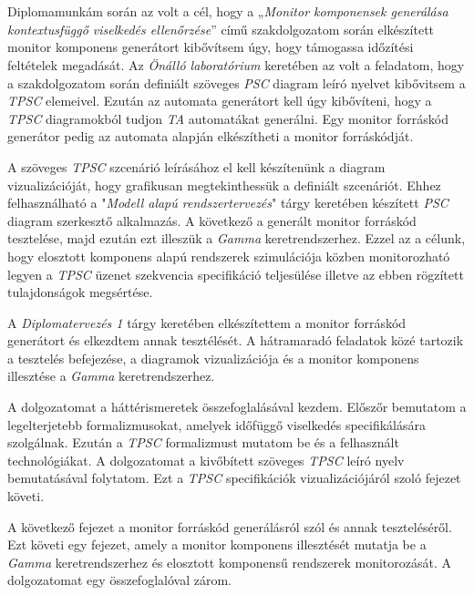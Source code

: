 \chapter{\bevezetes}
Diplomamunkám során az volt a cél, hogy a „\textit{Monitor komponensek generálása kontextusfüggő viselkedés ellenőrzése}” című szakdolgozatom során elkészített monitor komponens generátort kibővítsem úgy, hogy támogassa időzítési feltételek megadását.
Az \textit{Önálló laboratórium} keretében az volt a feladatom, hogy a szakdolgozatom során definiált szöveges \textit{PSC} diagram leíró nyelvet kibővitsem a \textit{TPSC} elemeivel.
Ezután az automata generátort kell úgy kibővíteni, hogy a \textit{TPSC} diagramokból tudjon \textit{TA} automatákat generálni.
Egy monitor forráskód generátor pedig az automata alapján elkészítheti a monitor forráskódját.

A szöveges \textit{TPSC} szcenárió leírásához el kell készítenünk a diagram vizualizációját, hogy grafikusan megtekinthessük a definiált szcenáriót.
Ehhez felhasználható a "\textit{Modell alapú rendszertervezés}" tárgy keretében készített \textit{PSC} diagram szerkesztő alkalmazás.
A következő a generált monitor forráskód tesztelése, majd ezután ezt illeszük a \textit{Gamma} keretrendszerhez.
Ezzel az a célunk, hogy elosztott komponens alapú rendszerek szimulációja közben monitorozható legyen a \textit{TPSC} üzenet szekvencia specifikáció teljesülése illetve az ebben rögzített tulajdonságok megsértése.

A \textit{Diplomatervezés 1} tárgy keretében elkészítettem a monitor forráskód generátort és elkezdtem annak tesztélését.
A hátramaradó feladatok közé tartozik a tesztelés befejezése, a diagramok vizualizációja és a monitor komponens illesztése a \textit{Gamma} keretrendszerhez.

A dolgozatomat a háttérismeretek összefoglalásával kezdem.
Előszőr bemutatom a legelterjetebb formalizmusokat, amelyek időfüggő viselkedés specifikálására szolgálnak.
Ezután a \textit{TPSC} formalizmust mutatom be és a felhasznált technológiákat.
A dolgozatomat a kivőbített szöveges \textit{TPSC} leíró nyelv bemutatásával folytatom.
Ezt a \textit{TPSC} specifikációk vizualizációjáról szoló fejezet követi.

A következő fejezet a monitor forráskód generálásról szól és annak teszteléséről.
Ezt követi egy fejezet, amely a monitor komponens illesztését mutatja be a \textit{Gamma} keretrendszerhez és elosztott komponensű rendszerek monitorozását.
A dolgozatomat egy összefoglalóval zárom.